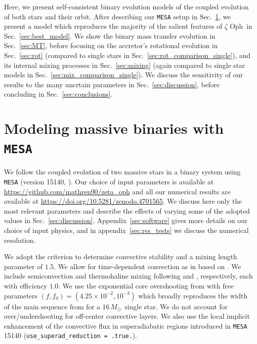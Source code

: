 \documentclass[twocolumn,twocolappendix,trackchanges]{aastex63}
\DeclareRobustCommand{\Secref}[1]{Sec.~\ref{#1}}
\newcommand{\zoph}{$\zeta$ Oph}
\newcommand{\Msun}{\ensuremath{\,M_\odot}}
\begin{document}
Here, we present
self-consistent binary evolution models of the coupled evolution of
both stars and their orbit. After describing our \texttt{MESA} setup
in \Secref{sec:methods}, we present a model which reproduces the
majority of the salient features of \zoph\ in
\Secref{sec:best_model}. We show the binary mass transfer evolution in
\Secref{sec:MT}, before focusing on the accretor's rotational
evolution in \Secref{sec:rot} (compared to single stars in
\Secref{sec:rot_comparison_single}), and its internal mixing processes
in \Secref{sec:mixing} (again compared to single star models in
\Secref{sec:mix_comparison_single}). We discuss the sensitivity of our
results to the many uncrtain parameters in \Secref{sec:discussion}, before
concluding in \Secref{sec:conclusions}.



\section{Modeling massive binaries with \texttt{MESA}}
\label{sec:methods}

We follow the coupled evolution of two massive stars in a binary
system using \texttt{MESA} (version 15140, \citealt{paxton:11,
  paxton:13, paxton:15, paxton:18, paxton:19}). Our choice of input
parameters is available at \url{https://github.com/mathren90/zeta_oph}
and all our numerical results are available at
\url{https://doi.org/10.5281/zenodo.4701565}. We discuss here only the
most relevant parameters and describe the effects of varying some of
the adopted values in
\Secref{sec:discussion}. Appendix~\ref{sec:software} gives more
details on our choice of input physics, and in
appendix~\ref{sec:res_tests} we discuss the numerical resolution.

We adopt the \cite{ledoux:47} criterion to determine convective
stability and a mixing length parameter of $1.5$. We allow for
time-dependent convection as in \cite{renzo:20:ppi_conv} based on
\cite{arnett:69}. We include semiconvection and thermohaline mixing
following \cite{langer:83} and \cite{kippenhahn:80}, respectively,
each with efficiency $1.0$.  We use the exponential core overshooting
from \cite{herwig:00} with free parameters
$(f, f_0)=(4.25\times10^{-2}, 10^{-3})$ \citep{claret:17} which
broadly reproduces the width of the main sequence from \cite{brott:11}
for a 16\Msun\ single star. We do not account for over/undershooting for
off-center convective layers. We also use the local implicit
enhancement of the convective flux in superadiabatic regions
introduced in \texttt{MESA} 15140 (\texttt{use\_superad\_reduction = .true.}).
\end{document}
